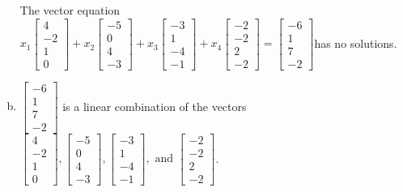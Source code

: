 \begin{exerciseAnswer}
\begin{enumerate}[(a)]
\begin{center}
\begin{minipage}{0.8\textwidth}
 The vector equation \( x_{1} \left[\begin{array}{c}
4 \\
-2 \\
1 \\
0
\end{array}\right] + x_{2} \left[\begin{array}{c}
-5 \\
0 \\
4 \\
-3
\end{array}\right] + x_{3} \left[\begin{array}{c}
-3 \\
1 \\
-4 \\
-1
\end{array}\right] + x_{4} \left[\begin{array}{c}
-2 \\
-2 \\
2 \\
-2
\end{array}\right] = \left[\begin{array}{c}
-6 \\
1 \\
7 \\
-2
\end{array}\right] \)has no solutions.
\end{minipage}\end{center}
    
\item 

\( \left[\begin{array}{c}
-6 \\
1 \\
7 \\
-2
\end{array}\right] \) is a linear combination of the vectors \( \left[\begin{array}{c}
4 \\
-2 \\
1 \\
0
\end{array}\right] , \left[\begin{array}{c}
-5 \\
0 \\
4 \\
-3
\end{array}\right] , \left[\begin{array}{c}
-3 \\
1 \\
-4 \\
-1
\end{array}\right] , \text{ and } \left[\begin{array}{c}
-2 \\
-2 \\
2 \\
-2
\end{array}\right] \). 


\end{enumerate}
    
\end{exerciseAnswer}
    
